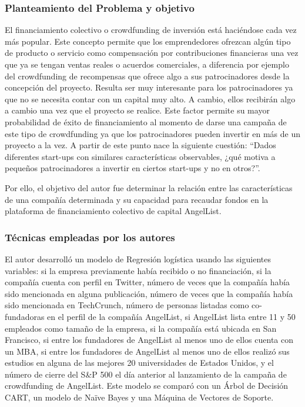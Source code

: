 \subsubsection{Planteamiento del Problema y objetivo}
El financiamiento colectivo o crowdfunding de inversión está haciéndose cada vez más popular. Este concepto permite que los emprendedores ofrezcan algún tipo de producto o servicio como compensación por contribuciones financieras una vez que ya se tengan ventas reales o acuerdos comerciales, a diferencia por ejemplo del crowdfunding de recompensas que ofrece algo a sus patrocinadores desde la concepción del proyecto. Resulta ser muy interesante para los patrocinadores ya que no se necesita contar con un capital muy alto. A cambio, ellos recibirán algo a cambio una vez que el proyecto se realice. Este factor permite su mayor probabilidad de éxito de financiamiento al momento de darse una campaña de este tipo de crowdfunding ya que los patrocinadores pueden invertir en más de un proyecto a la vez. A partir de este punto nace la siguiente cuestión: “Dados diferentes start-ups con similares características observables, ¿qué motiva a pequeños patrocinadores a invertir en ciertos start-ups y no en otros?”.

Por ello, el objetivo del autor fue determinar la relación entre las características de una compañía determinada y su capacidad para recaudar fondos en la plataforma de financiamiento colectivo de capital AngelList.

\subsubsection{Técnicas empleadas por los autores}
El autor desarrolló un modelo de Regresión logística usando las siguientes variables: si la empresa previamente había recibido o no financiación, si la compañía cuenta con perfil en Twitter, número de veces que la compañía había sido mencionada en alguna publicación, número de veces que la compañía había sido mencionada en TechCrunch, número de personas listadas como co-fundadoras en el perfil de la compañía AngelList, si AngelList lista entre 11 y 50 empleados como tamaño de la empresa, si la compañía está ubicada en San Francisco, si entre los fundadores de AngelList al menos uno de ellos cuenta con un MBA, si entre los fundadores de AngelList al menos uno de ellos realizó sus estudios en alguna de las mejores 20 universidades de Estados Unidos, y el número de cierre del S\&P 500 el día anterior al lanzamiento de la campaña de crowdfunding de AngelList.
Este modelo se comparó con un Árbol de Decisión CART, un modelo de Naïve Bayes y una Máquina de Vectores de Soporte.

